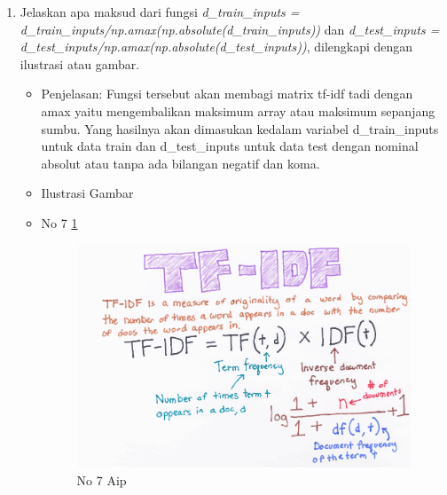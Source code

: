\begin{enumerate}
\item Jelaskan apa maksud dari fungsi \emph{d\_train\_inputs = d\_train\_inputs/np.amax(np.absolute(d\_train\_inputs))} dan \emph{d\_test\_inputs = d\_test\_inputs/np.amax(np.absolute(d\_test\_inputs))}, dilengkapi dengan ilustrasi atau gambar.
\begin{itemize}
\item Penjelasan: Fungsi tersebut akan membagi matrix tf-idf tadi dengan amax yaitu mengembalikan maksimum array atau maksimum sepanjang sumbu. Yang hasilnya akan dimasukan kedalam variabel d\_train\_inputs untuk data train dan d\_test\_inputs untuk data test dengan nominal absolut atau tanpa ada bilangan negatif dan koma.
\par 
\par
\item Ilustrasi Gambar
\item No 7 \ref{teori7}
\begin{figure}[!hbtp]
\centering
\includegraphics[scale=0.4]{figures/AIP/g7.PNG}
\caption{No 7 Aip}
\label{teori7}
\end{figure}
\par
\end{itemize}
\par
\par


\end{enumerate}
